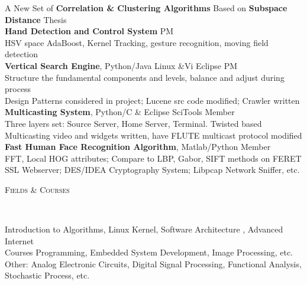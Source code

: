 \documentclass[10pt,a4paper]{article}
\newenvironment{changemargin}[2]{%
  \begin{list}{}{%
    \setlength{\topsep}{0pt}%
    \setlength{\leftmargin}{#1}%
    \setlength{\rightmargin}{#2}%
    \setlength{\listparindent}{\parindent}%
    \setlength{\itemindent}{\parindent}%
    \setlength{\parsep}{\parskip}%
  }%
  \item[]}{\end{list}
}
\newcommand{\lineover}{
	\begin{changemargin}{-0.05in}{-0.05in}
		\vspace*{-8pt}
		\hrulefill \\
		\vspace*{-2pt}
	\end{changemargin}
}
\newcommand{\header}[1]{
	\begin{changemargin}{-0.5in}{-0.5in}
		\scshape{#1}\\
  	\lineover
	\end{changemargin}
}
\newenvironment{body} {
	\vspace*{-16pt}
	\begin{changemargin}{-0.25in}{-0.5in}
  }	
	{\end{changemargin}
}
\begin{document}
\begin{body}
	\vspace{14pt}
	A New Set of \textbf{Correlation \& Clustering Algorithms} Based on \textbf{Subspace Distance} \hfill Thesis \\
	\smallskip
	\textbf{Hand Detection and Control System} \hfill PM \\
	\qquad HSV space AdaBoost, Kernel Tracking, gesture recognition, moving field detection \\
	\smallskip
	\textbf{Vertical Search Engine}, Python/Java Linux \&Vi Eclipse \hfill PM \\
	\qquad Structure the fundamental components and levels, balance and adjust during process \\
	\qquad Design Patterns considered in project; Lucene src code modified; Crawler written \\
	\smallskip
	\textbf{Multicasting System}, Python/C \& Eclipse SciTools \hfill Member \\
	\qquad Three layers set: Source Server, Home Server, Terminal. Twisted based \\
	\qquad Multicasting video and widgets written, have FLUTE multicast protocol modified \\
	\smallskip
	\textbf{Fast Human Face Recognition Algorithm}, Matlab/Python \hfill Member \\
	\qquad FFT, Local HOG attributes; Compare to LBP, Gabor, SIFT methods on FERET \\
	\smallskip
	SSL Webserver; DES/IDEA Cryptography System; Libpcap Network Sniffer, etc. \\
\end{body}

\smallskip


\header{Fields \& Courses}

\begin{body}
	\vspace{14pt}
	Introduction to Algorithms, Linux Kernel, Software Architecture	, Advanced Internet \\
	Courses	Programming, Embedded System Development, Image Processing, etc. \\
	Other: Analog Electronic Circuits, Digital Signal Processing, Functional Analysis, Stochastic Process, etc. \\
\end{body}

\smallskip
\end{document}

